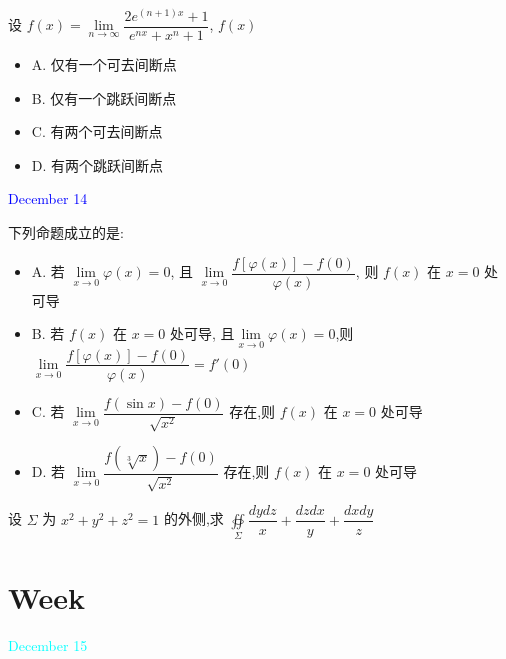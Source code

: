 \begin{example}[][Exam: 38.2.12]
	设 $f(x)=\lim\limits_{n\to\infty}\dfrac{2e^{(n+1)x}+1}{e^{nx}+x^{n}+1}$, $f(x)$
\begin{itemize}
	\item A. 仅有一个可去间断点 
	\item B. 仅有一个跳跃间断点
	\item C. 有两个可去间断点
	\item D. 有两个跳跃间断点
\end{itemize}
\end{example}

\begin{solution}
	
\end{solution}


\textcolor{blue}{December 14}

\begin{example}[][Exam: 38.2.13]
	下列命题成立的是:
\begin{itemize}
	\item A. 若 $\lim\limits_{x\to 0}\varphi(x)=0$, 且 $\lim\limits_{x\to 0}\dfrac{f\left[\varphi(x)\right]-f(0)}{\varphi(x)}$, 则 $f(x)$ 在 $x=0$ 处可导
	\item B. 若 $f(x)$ 在 $x=0$ 处可导, 且$\lim\limits_{x\to 0}\varphi(x)=0$,则$\lim\limits_{x\to 0}\dfrac{f\left[\varphi(x)\right]-f(0)}{\varphi(x)}=f'(0)$
	\item C. 若 $\lim\limits_{x\to 0}\dfrac{f(\sin x)-f(0)}{\sqrt{x^{2}}}$ 存在,则 $f(x)$ 在 $x=0$ 处可导
	\item D. 若 $\lim\limits_{x\to 0}\dfrac{f(\sqrt[3]{x})-f(0)}{\sqrt{x^{2}}}$ 存在,则 $f(x)$ 在 $x=0$ 处可导
\end{itemize}
\end{example}

\begin{solution}
	
\end{solution}

\begin{example}[][Exam: 38.2.14]
	设 $\Sigma$ 为 $x^{2}+y^{2}+z^{2}=1$ 的外侧,求 $\displaystyle{\oiint\limits_{\Sigma}\dfrac{dydz}{x}+\dfrac{dzdx}{y}+\dfrac{dxdy}{z}}$
\end{example}
\begin{solution}
	
\end{solution}


\section{Week }
\textcolor{cyan}{December 15}

